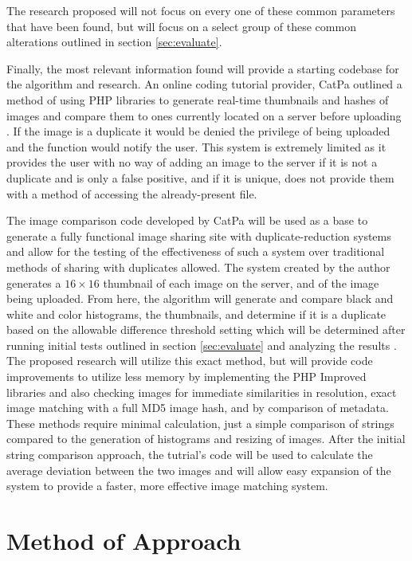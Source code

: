 \documentclass[11pt]{article}
\begin{document}
The research proposed will not focus on every one of these common parameters that have been found, but will focus on a select group of these common alterations outlined in section \ref{sec:evaluate}.

Finally, the most relevant information found will provide a starting codebase for the algorithm and research. An online coding tutorial provider, CatPa outlined a method of using PHP libraries to generate real-time thumbnails and hashes of images and compare them to ones currently located on a server before uploading \cite{catpa:gdcode}. If the image is a duplicate it would be denied the privilege of being uploaded and the function would notify the user. This system is extremely limited as it provides the user with no way of adding an image to the server if it is not a duplicate and is only a false positive, and if it is unique, does not provide them with a method of accessing the already-present file.

The image comparison code developed by CatPa will be used as a base to generate a fully functional image sharing site with duplicate-reduction systems and allow for the testing of the effectiveness of such a system over traditional methods of sharing with duplicates allowed. The system created by the author generates a $16\times 16$ thumbnail of each image on the server, and of the image being uploaded. From here, the algorithm will generate and compare black and white and color histograms, the thumbnails, and determine if it is a duplicate based on the allowable difference threshold setting which will be determined after running initial tests outlined in section \ref{sec:evaluate} and analyzing the results \cite{catpa:gdcode}. The proposed research will utilize this exact method, but will provide code improvements to utilize less memory by implementing the PHP Improved libraries and also checking images for immediate similarities in resolution, exact image matching with a full MD5 image hash, and by comparison of metadata. These methods require minimal calculation, just a simple comparison of strings compared to the generation of histograms and resizing of images. After the initial string comparison approach, the tutrial's code will be used to calculate the average deviation between the two images and will allow easy expansion of the system to provide a faster, more effective image matching system.

\vspace*{-.2in}
\section{Method of Approach}
\label{sec:method}
\vspace*{-.1in}
\end{document}
